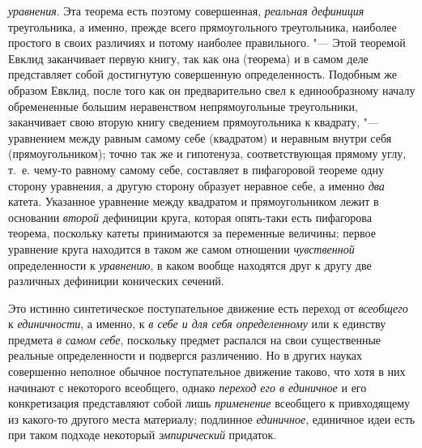 {\em уравнения}. Эта
теорема есть поэтому совершенная,
{\em реальная дефиниция}
треугольника, а именно, прежде всего прямоугольного
треугольника, наиболее простого в своих различиях и потому наиболее
правильного. "--- Этой теоремой Евклид заканчивает первую
книгу, так как она (теорема) и в самом деле представляет собой достигнутую
совершенную определенность. Подобным же образом Евклид, после того как он
предварительно свел к единообразному
началу
обремененные большим неравенством непрямоугольные
треугольники, заканчивает свою вторую книгу сведением прямоугольника к
квадрату, "--- уравнением между равным самому себе (квадратом)
и
неравным внутри себя (прямоугольником); точно так же и
гипотенуза, соответствующая прямому углу, т.~е. чему-то равному самому
себе, составляет в пифагоровой теореме одну сторону уравнения, а другую
сторону образует неравное себе, а именно
{\em два} катета.
Указанное уравнение между квадратом и прямоугольником лежит в основании
{\em второй} дефиниции
круга, которая опять-таки есть пифагорова теорема, поскольку катеты
принимаются за переменные величины; первое уравнение круга находится в
таком же самом отношении
{\em чувственной}
определенности к
{\em уравнению}, в каком
вообще находятся друг к другу две различных дефиниции конических сечений.

Это истинно синтетическое поступательное движение есть переход
от {\em всеобщего} к
{\em единичности}, а
именно, к {\em в себе и для себя
определенному} или к единству предмета
{\em в самом себе},
поскольку предмет распался на свои существенные реальные
определенности и подвергся различению. Но в других науках совершенно
неполное обычное поступательное движение таково, что хотя в них начинают с
некоторого всеобщего, однако
{\em переход его в единичное}
и его конкретизация представляют собой лишь
{\em применение}
всеобщего к привходящему из какого-то другого места
материалу; подлинное {\em единичное},
единичное идеи есть при таком подходе некоторый
{\em эмпирический} придаток.

